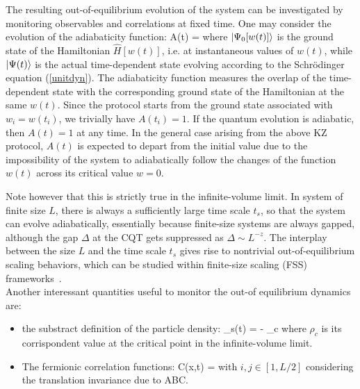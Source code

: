 The resulting out-of-equilibrium evolution of the system can be
investigated by monitoring observables and correlations at fixed time.
One may consider the evolution of the adiabaticity function:
	A(t) =  \cm
\ea
where $\ket{\Psi_0[w(t)]}$ is the ground state of the
Hamiltonian $\hat H[w(t)]$, i.e. at instantaneous values of $w(t)$,
while $\ket{\Psi(t)}$ is the actual time-dependent state
evolving according to the Schr\"odinger equation (\ref{unitdyn}).  The
adiabaticity function measures the overlap of the time-dependent state
with the corresponding ground state of the Hamiltonian at the same
$w(t)$. Since the protocol starts from the ground state associated
with $w_i=w(t_i)$, we trivially have $A(t_i) = 1$.  If the quantum
evolution is adiabatic, then $A(t)=1$ at any time.  In the general
case arising from the above KZ protocol, $A(t)$ is expected to depart
from the initial value due to the impossibility of the system to
adiabatically follow the changes of the function $w(t)$ across its
critical value $w=0$.

Note however that this is strictly true in the infinite-volume limit.  In system of
finite size $L$, there is always a sufficiently large time scale $t_s$, so that the system 
can evolve adiabatically, essentially because finite-size systems are always gapped, 
although the gap $\Delta$ at the CQT gets suppressed as $\Delta \sim L^{-z}$. The
interplay between the size $L$ and the time scale $t_s$ gives rise to nontrivial 
out-of-equilibrium scaling behaviors, which can be studied within finite-size scaling (FSS)
frameworks~\cite{rossini2020dynamic, rossini2021coherent}.\\

Another interessant quantities useful to monitor the out-of equilibrium dynamics are:
\begin{itemize}
	\item
		the substract definition of the particle density:
			\rho_s(t) = 
			- \rho_c \pc
		\ea
		where $\rho_c$ is its corrispondent value at the critical point in the 
		infinite-volume limit.
	\item
		The fermionic correlation functions:
			C(x,t) = \cm
		\ea
		with $i,j \in [1,L/2]$ considering the translation invariance due to ABC.
\end{itemize}


